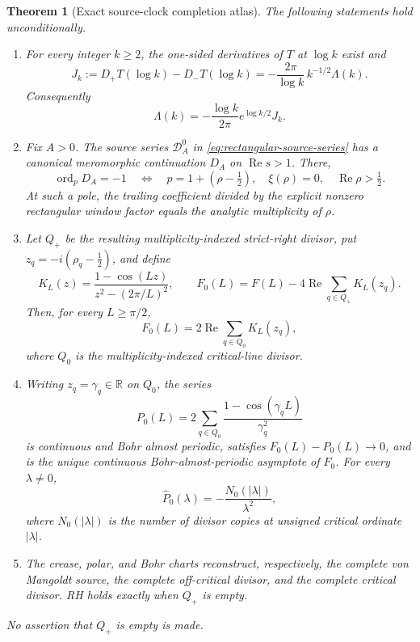 \documentclass[11pt]{article}
\newtheorem{theorem}{Theorem}[section]
\theoremstyle{definition}
\theoremstyle{remark}
\newcommand{\R}{\mathbb R}
\newcommand{\ord}{\operatorname{ord}}
\newcommand{\Rea}{\operatorname{Re}}
\begin{document}
\begin{theorem}[Exact source-clock completion atlas]
\label{thm:complete-clock-atlas}
The following statements hold unconditionally.
\begin{enumerate}[label=\textup{(\alph*)}]
\item For every integer $k\ge2$, the one-sided derivatives of $T$ at $\log k$ exist and
\[
 J_k:=D_+T(\log k)-D_-T(\log k)
   =-\frac{2\pi}{\log k}\,k^{-1/2}\Lambda(k).
 \tag{3.7}\label{eq:crease-current}
\]
Consequently
\[
 \Lambda(k)=-\frac{\log k}{2\pi}e^{\log k/2}J_k.
 \tag{3.8}\label{eq:crease-inversion}
\]
\item Fix $A>0$.  The source series $\mathscr D_A^{0}$ in
\eqref{eq:rectangular-source-series} has a canonical meromorphic continuation $D_A$ on
$\Rea s>1$.  There,
\[
 \ord_p D_A=-1
 \quad\Longleftrightarrow\quad
 p=1+(\rho-\tfrac12),\quad \xi(\rho)=0,\quad \Rea\rho>\tfrac12.
 \tag{3.9}\label{eq:polar-chart}
\]
At such a pole, the trailing coefficient divided by the explicit nonzero rectangular window
factor equals the analytic multiplicity of $\rho$.
\item Let $Q_+$ be the resulting multiplicity-indexed strict-right divisor, put
$z_q=-i(\rho_q-\tfrac12)$, and define
\[
 K_L(z)=\frac{1-\cos(Lz)}{z^2-(2\pi/L)^2},\qquad
 F_0(L)=F(L)-4\Rea\sum_{q\in Q_+}K_L(z_q).
 \tag{3.10}\label{eq:polar-subtracted-clock}
\]
Then, for every $L\ge\pi/2$,
\[
 F_0(L)=2\Rea\sum_{q\in Q_0}K_L(z_q),
 \tag{3.11}\label{eq:critical-rational-residual}
\]
where $Q_0$ is the multiplicity-indexed critical-line divisor.
\item Writing $z_q=\gamma_q\in\R$ on $Q_0$, the series
\[
 P_0(L)=2\sum_{q\in Q_0}
       \frac{1-\cos(\gamma_qL)}{\gamma_q^2}
 \tag{3.12}\label{eq:critical-bohr-model}
\]
is continuous and Bohr almost periodic, satisfies $F_0(L)-P_0(L)\to0$, and is the unique
continuous Bohr-almost-periodic asymptote of $F_0$.  For every $\lambda\ne0$,
\[
 \widehat P_0(\lambda)=-\frac{N_0(|\lambda|)}{\lambda^2},
 \tag{3.13}\label{eq:critical-bohr-count}
\]
where $N_0(|\lambda|)$ is the number of divisor copies at unsigned critical ordinate
$|\lambda|$.
\item The crease, polar, and Bohr charts reconstruct, respectively, the complete von Mangoldt
source, the complete off-critical divisor, and the complete critical divisor.  RH holds exactly
when $Q_+$ is empty.
\end{enumerate}
No assertion that $Q_+$ is empty is made.
\end{theorem}
\end{document}
